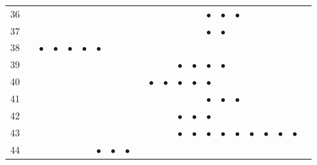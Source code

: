 \documentclass[text.tex]{subfiles}
\begin{document}
\begin{table}
\begin{tabular}{l|ccccccccccccccccccccc}
36  &           &           &           &           &           &           &           &           &           &           &           &           &           & $\bullet$ & $\bullet$ & $\bullet$ &           &           &           &           &           \\
37  &           &           &           &           &           &           &           &           &           &           &           &           &           & $\bullet$ & $\bullet$ &           &           &           &           &           &           \\
38  &           & $\bullet$ & $\bullet$ & $\bullet$ & $\bullet$ & $\bullet$ &           &           &           &           &           &           &           &           &           &           &           &           &           &           &           \\
39  &           &           &           &           &           &           &           &           &           &           &           & $\bullet$ & $\bullet$ & $\bullet$ & $\bullet$ &           &           &           &           &           &           \\
40  &           &           &           &           &           &           &           &           &           & $\bullet$ & $\bullet$ & $\bullet$ & $\bullet$ & $\bullet$ &           &           &           &           &           &           &           \\
41  &           &           &           &           &           &           &           &           &           &           &           &           &           & $\bullet$ & $\bullet$ & $\bullet$ &           &           &           &           &           \\
42  &           &           &           &           &           &           &           &           &           &           &           & $\bullet$ & $\bullet$ & $\bullet$ &           &           &           &           &           &           &           \\ 
43  &           &           &           &           &           &           &           &           &           &           &           & $\bullet$ & $\bullet$ & $\bullet$ & $\bullet$ & $\bullet$ & $\bullet$ & $\bullet$ & $\bullet$ & $\bullet$ &           \\
44  &           &           &           &           &           & $\bullet$ & $\bullet$ & $\bullet$ &           &           &           &           &           &           &           &           &           &           &           &           &           \\

\end{tabular}
\end{table}
\end{document}
